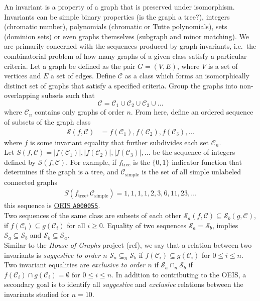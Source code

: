 \documentclass[12pt]{article}
\newcommand{\OEIS}[1]
{\href{https://oeis.org/#1}{OEIS \texttt{#1}}}
\newcommand{\SEQ}{\mathcal{S}}
\newcommand{\CLASS}{\mathcal{C}}
\newcommand{\SIMPLECLASS}{\mathcal{C}_\text{simple}}
\newcommand{\ie}[0]{i.e.\ }
\begin{document}
An invariant is a property of a graph that is preserved under isomorphism. 
Invariants can be simple binary properties (is the graph a tree?), integers (chromatic number), polynomials (chromatic or Tutte polynomials), sets (dominion sets) or even graphs themselves (subgraph and minor matching).
We are primarily concerned with the sequences produced by graph invariants, \ie the combinatorial problem of how many graphs of a given class satisfy a particular criteria.
Let a graph be defined as the pair $G = (V,E)$, where $V$ is a set of vertices and $E$ a set of edges. 
Define $\CLASS$ as a class which forms an isomorphically distinct set of graphs that satisfy a specified criteria.
Group the graphs into non-overlapping subsets such that
\begin{equation}
\CLASS = \CLASS_1 \cup \CLASS_2 \cup \CLASS_3 \cup \ldots
\end{equation}
where $\CLASS_n$ contains only graphs of order $n$.
From here, define an ordered sequence of subsets of the graph class
%
\begin{align}
\SEQ(f, \CLASS) 
&= f(\CLASS_1), f(\CLASS_2), f(\CLASS_3), \ldots
\end{align}
%
where $f$ is some invariant equality that further subdivides each set $\CLASS_n$. \\

Let 
$S(f, \CLASS) = |f(\CLASS_1)|, |f(\CLASS_2)|, |f(\CLASS_3)|, \ldots$
be the sequence of integers defined by $\SEQ(f, \CLASS)$. For example, if $f_\text{tree}$ is the $\{0,1\}$ indicator function that determines if the graph is a tree, and $\SIMPLECLASS$ is the set of all simple unlabeled connected graphs
%
\begin{align}
S(f_\text{tree}, \SIMPLECLASS) = 1, 1, 1, 1, 2, 3, 6, 11, 23, \ldots
\end{align}
%
this sequence is \OEIS{A000055}. \\

Two sequences of the same class are subsets of each other $\SEQ_a(f,\CLASS) \subseteq \SEQ_b(g, \CLASS)$, if $f(\CLASS_i) \subseteq g(\CLASS_i)$ for all $i\ge0$. Equality of two sequences $\SEQ_a = \SEQ_b$, implies $\SEQ_a \subseteq \SEQ_b$ and $\SEQ_b \subseteq \SEQ_a$.  \\

Similar to the \textit{House of Graphs} project (ref), we say that a relation between two invariants is \textit{suggestive to order $n$} $\SEQ_a \subseteq_n \SEQ_b$ if $f(\CLASS_i) \subseteq g(\CLASS_i)$ for $0 \le i \le n$.
Two invariant equalities are \textit{exclusive to order $n$} if $\SEQ_a \cap_n \SEQ_b$ if $f(\CLASS_i) \cap g(\CLASS_i) = \emptyset$ for $0 \le i \le n$.
In addition to contributing to the OEIS, a secondary goal is to identify all \textit{suggestive} and \textit{exclusive} relations between the invariants studied for $n=10$.
\end{document}
